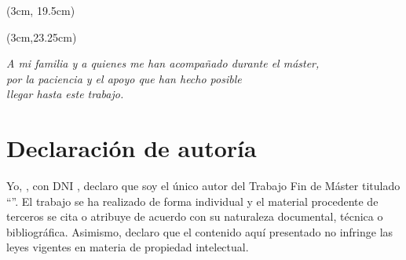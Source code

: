 \begin{textblock*}{\textwidth}(3cm, 19.5cm)
\begin{flushleft}\doublespacing
{\fontsize{14pt}{4pt}\selectfont {} \autor}

{\fontsize{14pt}{4pt}\selectfont {} \director}

{\fontsize{14pt}{4pt}\selectfont {} \codirector}
\end{flushleft}
\end{textblock*}

\begin{textblock*}{\textwidth}(3cm,23.25cm)
\begin{flushright}
{\fontsize{14pt}{4pt}\selectfont \fecha}
\end{flushright}
\end{textblock*}

\clearpage

\cleardoublepage
\thispagestyle{empty}

\vspace*{9cm}
\begin{flushright}\em
A mi familia y a quienes me han acompañado durante el máster, \\
por la paciencia y el apoyo que han hecho posible \\
llegar hasta este trabajo.
\end{flushright}
\clearpage

\cleardoublepage
\thispagestyle{plain}
\chapter*{Declaración de autoría}

Yo, \autor, con DNI \dni, declaro que soy el único autor del Trabajo Fin de Máster titulado ``\titulo''. El trabajo se ha realizado de forma individual y el material procedente de terceros se cita o atribuye de acuerdo con su naturaleza documental, técnica o bibliográfica. Asimismo, declaro que el contenido aquí presentado no infringe las leyes vigentes en materia de propiedad intelectual.

